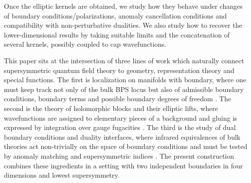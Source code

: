 \documentclass[11pt,a4paper]{article}
\numberwithin{equation}{section}
\theoremstyle{plain}
\theoremstyle{definition}
\theoremstyle{remark}
\begin{document}
Once the elliptic kernels are obtained, we study how they  behave under changes of boundary conditions/polarizations, anomaly cancellation conditions and compatibility with non-perturbative dualities. We also study how to recover the lower-dimensional results by taking suitable limits and the concatenation of several kernels, possibly coupled to cap wavefunctions. 
 
This paper sits at the intersection of three lines of work which naturally connect supersymmetric quantum field theory to geometry, representation theory and special functions. The first is localization on manifolds with boundary, where one must keep track not only of the bulk BPS locus but also of admissible boundary conditions, boundary terms and possible boundary degrees of freedom \cite{Hori:2013ika,Longhi:2019hdh,Sugiyama:2020uqh,Iannotti:2023jji,Dedushenko:2018aox,Dedushenko:2018tgx,Dedushenko:2022uay}.  The second is the theory of holomorphic blocks and their elliptic lifts, where wavefunctions are assigned to elementary pieces of a background and gluing is expressed by integration over gauge fugacities \cite{Pasquetti:2011fj,Beem:2012mb,Nieri:2015yia}.  The third is the study of dual boundary conditions and duality interfaces, where infrared equivalences of bulk theories act non-trivially on the space of boundary conditions and must be tested by anomaly matching and supersymmetric indices \cite{Dimofte:2017tpi}.  The present construction combines these ingredients in a setting with two independent boundaries in four dimensions and lowest supersymmetry.


\end{document}
